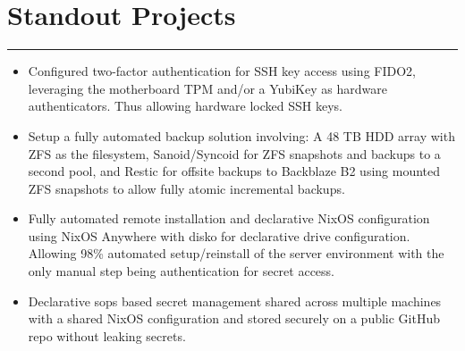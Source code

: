 \documentclass[a4paper,11pt]{article}
\begin{document}
\vspace{-1.1cm}
\section*{\hspace*{1em} Standout Projects}
\vspace{-0.2cm}
\hrule
\vspace{0.3cm}
\begin{itemize}
    \item Configured two-factor authentication for SSH key access using FIDO2, leveraging the motherboard TPM and/or a YubiKey as hardware authenticators. Thus allowing hardware locked SSH keys. \\
    \vspace{-0.5cm}
    \item Setup a fully automated backup solution involving: A 48 TB HDD array with ZFS as the filesystem, Sanoid/Syncoid for ZFS snapshots and backups to a second pool, and Restic for offsite backups to Backblaze B2 using mounted ZFS snapshots to allow fully atomic incremental backups. \\
    \vspace{-0.5cm}
    \item Fully automated remote installation and declarative NixOS configuration using NixOS Anywhere with disko for declarative drive configuration. Allowing 98\% automated setup/reinstall of the server environment with the only manual step being authentication for secret access. \\
    \vspace{-0.5cm}
    \item Declarative sops based secret management shared across multiple machines with a shared NixOS configuration and stored securely on a public GitHub repo without leaking secrets. \\
    \vspace{-0.5cm}
\end{itemize}
\end{document}
